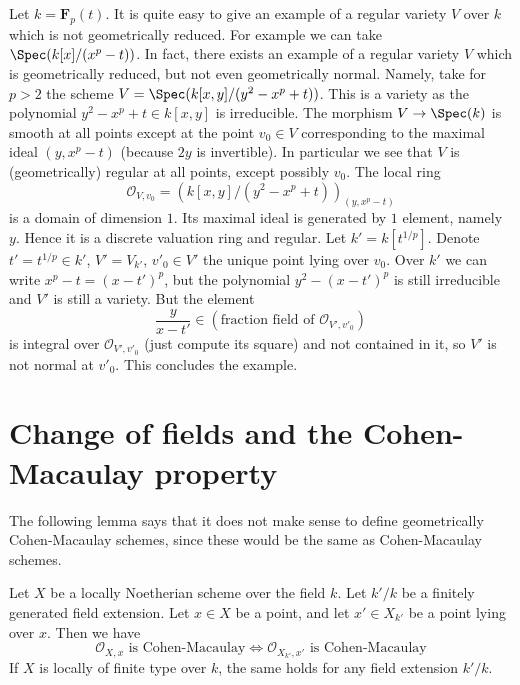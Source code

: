 \begin{example}
\label{example-geometrically-reduced-not-normal}
Let $k =\mathbf{F}_p(t)$. It is quite easy to give an example of a regular
variety $V$ over $k$ which is not geometrically reduced. For example we
can take $\Spec(k[x]/(x^p - t))$. In fact, there exists an
example of a regular variety $V$ which is geometrically reduced, but
not even geometrically normal. Namely, take for $p > 2$ the scheme
$V = \Spec(k[x, y]/(y^2 - x^p + t))$. This is a variety as the
polynomial $y^2 - x^p + t \in k[x, y]$ is irreducible.
The morphism $V \to \Spec(k)$ is smooth at all points
except at the point $v_0 \in V$ corresponding to the maximal ideal
$(y, x^p - t)$ (because $2y$ is invertible). In particular we see that
$V$ is (geometrically) regular at all points, except possibly $v_0$.
The local ring
$$
\mathcal{O}_{V, v_0} = \left(k[x, y]/(y^2 - x^p + t)\right)_{(y, x^p - t)}
$$
is a domain of dimension $1$. Its maximal ideal is generated by $1$ element,
namely $y$. Hence it is a discrete valuation ring and regular.
Let $k' = k[t^{1/p}]$. Denote $t' = t^{1/p} \in k'$,
$V' = V_{k'}$, $v'_0 \in V'$ the unique point lying over $v_0$.
Over $k'$ we can write $x^p - t = (x - t')^p$, but the polynomial
$y^2 - (x - t')^p$ is still irreducible and $V'$ is still a variety.
But the element
$$
\frac{y}{x - t'} \in (\text{fraction field of }\mathcal{O}_{V', v'_0})
$$
is integral over $\mathcal{O}_{V', v'_0}$ (just compute its square)
and not contained in it, so $V'$ is not normal at $v'_0$. This concludes
the example.
\end{example}







\section{Change of fields and the Cohen-Macaulay property}
\label{section-CM}

\noindent
The following lemma says that it does not make sense to define
geometrically Cohen-Macaulay schemes, since these would be the
same as Cohen-Macaulay schemes.

\begin{lemma}
\label{lemma-CM-base-change}
Let $X$ be a locally Noetherian scheme over the field $k$.
Let $k'/k$ be a finitely generated field extension.
Let $x \in X$ be a point, and let $x' \in X_{k'}$ be a point lying
over $x$. Then we have
$$
\mathcal{O}_{X, x}\text{ is Cohen-Macaulay}
\Leftrightarrow
\mathcal{O}_{X_{k'}, x'}\text{ is Cohen-Macaulay}
$$
If $X$ is locally of finite type over $k$, the same holds for any
field extension $k'/k$.
\end{lemma}


